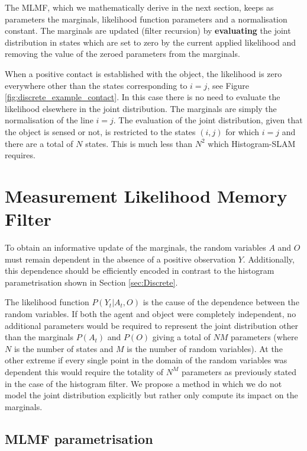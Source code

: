 The MLMF, which we mathematically derive in the next section, keeps as parameters the marginals, likelihood function parameters and a normalisation 
constant. The marginals are updated (filter recursion) by \textbf{evaluating} the joint distribution in states which are set to zero by the current 
applied likelihood and removing the value of the zeroed parameters from the marginals. 

When a positive contact is established with the object, the likelihood is zero everywhere other than the states corresponding to  $i=j$, 
see Figure \ref{fig:discrete_example_contact}. In this case there is no need to evaluate the likelihood elsewhere
in the joint distribution. The marginals are simply the normalisation of the line $i=j$. The evaluation of the joint distribution, 
given that the object is sensed or not, is restricted to the states $(i,j)$ for which $i=j$ and there are a total of $N$ states. 
This is much less than $N^2$ which Histogram-SLAM requires.


\FloatBarrier
\section{Measurement Likelihood Memory Filter}\label{ch5:MLMF}

To obtain an informative update of the marginals, the random variables $A$ and $O$ must remain 
dependent in the absence of a positive observation $Y$. Additionally, this dependence should be efficiently encoded in contrast to the
histogram parametrisation shown in Section \ref{sec:Discrete}. 

The likelihood function $P(Y_t|A_t,O)$ is the cause of the dependence between the random variables. If both the agent and object 
were completely independent, no additional parameters would be required to represent the joint distribution other than the marginals 
$P(A_t)$ and $P(O)$ giving a total of $N M$ parameters (where $N$ is the number of states and $M$ is the number of random variables). 
At the other extreme if every single point in the domain of the random variables was dependent this would require the totality 
of $N^M$ parameters as previously stated in the case of the histogram filter. We propose a method in which we do not model the joint
distribution explicitly but rather only compute its impact on the marginals. 

\subsection{MLMF parametrisation}

